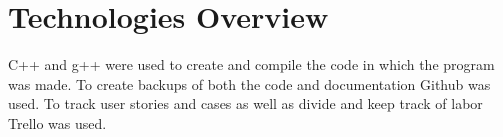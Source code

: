 \section{Technologies Overview}
C++ and g++ were used to create and compile the code in which the program was made.
 To create backups of both the code and documentation Github was used.
 To track user stories and cases as well as divide and keep track of labor Trello was used.

